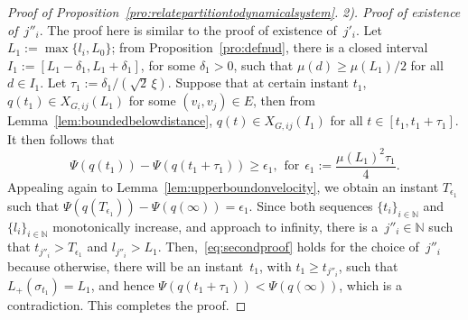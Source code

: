 \documentclass[10pt,twocolumn,twoside]{IEEEtran}
\renewcommand{\(}{\left (}
\renewcommand{\)}{\right )}
\renewcommand{\;}{\,;\,}
\newcommand{\N}{\mathbb{N}}
\begin{document}
\begin{proof}[Proof of Proposition~\ref{pro:relatepartitiontodynamicalsystem}]
\vspace{3pt}
\noindent
{\it 2). Proof of existence of~$j''_i$}. The proof here is similar to the proof of existence of~$j'_i$.  Let
$L_1:=\max\{l_i, L_0\}$;  
from Proposition~\ref{pro:defnud}, there is a closed interval 
$I_1:= [L_1 - \delta_1, L_1+ \delta_1]$, for some $\delta_1 > 0$,  
such that
$\mu(d) \ge \mu(L_1)/2$ for all $d \in I_1$.  Let $\tau_1 := {\delta_1} / (\sqrt{2} \, \xi )$. Suppose that at certain instant $t_1$, $q(t_1)\in X_{G,ij}(L_1)$ for some $(v_i,v_j)\in E$,  then from Lemma~\ref{lem:boundedbelowdistance}, 
$
q(t) \in  X_{G,ij}(I_1) 
$  for all  $t \in  [t_1, t_1 +  \tau_1 ]$. 
It then follows that 
$$
\Psi(q(t_1)) - \Psi(q(t_1 + \tau_1))   \ge \epsilon_1, \hspace{5pt} \mbox{for} \hspace{5pt} \epsilon_1 := \frac{\mu(L_1)^2\tau_1}{4}.
$$
Appealing again to Lemma~\ref{lem:upperboundonvelocity}, we obtain an instant $T_{\epsilon_1}$ such that 
$
\Psi(q(T_{\epsilon_1})) - \Psi(q(\infty)) = \epsilon_1 
$. 
Since both sequences $\{t_i\}_{i\in \N}$ and $\{l_i\}_{i\in \N}$ monotonically increase, and approach to infinity, there is a~$j''_i\in \N$ such that 
$
t_{j''_i} > T_{\epsilon_1}$ and  $l_{j''_i} > L_1$.  Then,~\eqref{eq:secondproof} holds for the choice of~$j''_i$ because otherwise, there will be an instant~$t_1$, with $t_1 \ge t_{j''_i}$, such that $L_+(\sigma_{t_1}) = L_1$, and hence
$\Psi(q(t_1 + \tau_1)) < \Psi(q(\infty))$, which is a contradiction. 
 This completes the proof.   
\end{proof}
\end{document}
